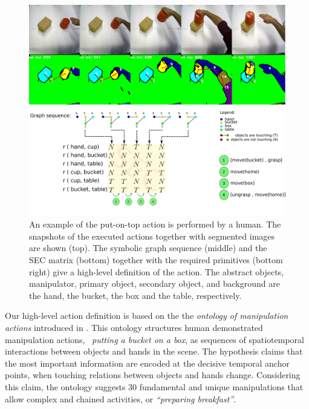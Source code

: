 \begin{figure}
      \centering
      \includegraphics[scale=0.20]{./pdf/action_graph_sec.pdf}
      \caption{ An example of the put-on-top action is performed by a human. 
The snapshots of the executed actions together with segmented images are shown (top).
The symbolic graph sequence (middle) and the SEC matrix (bottom) together with 
the required primitives (bottom right) give a high-level definition of the action.
The abstract objects, manipulator, primary object, secondary object, and background are the hand, the bucket, the box and the table, respectively.}
      \label{fig:action_graph_sec}
\end{figure}

 

Our high-level action definition is based on the the \textit{ontology of manipulation actions} introduced in \cite{TAMD13}.
This ontology structures human demonstrated manipulation actions, \eg~{\it putting a bucket on a box}, as sequences of spatiotemporal interactions between objects and hands in the scene. 
The hypothesis claims that the most important information are encoded at the decisive temporal anchor points, \ie when touching relations between objects and hands change. Considering this claim, the ontology suggests $30$ fundamental and unique manipulations that allow complex and chained activities,  or {\it ``preparing breakfast''}.

